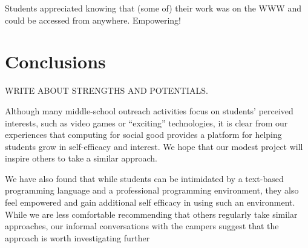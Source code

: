 Students appreciated knowing that (some of) their work was on the
WWW and could be accessed from anywhere.  Empowering!

\section{Conclusions}

WRITE ABOUT STRENGTHS AND POTENTIALS.

Although many middle-school outreach activities focus on students'
perceived interests, such as video games or ``exciting'' technologies,
it is clear from our experiences that computing for social good
provides a platform for helping students grow in self-efficacy and
interest.  We hope that our modest project will inspire others to
take a similar approach.

We have also found that while students can be intimidated by a text-based
programming language and a professional programming environment, they also
feel empowered and gain additional self efficacy in using such an environment.
While we are less comfortable recommending that others regularly take similar
approaches, our informal conversations with the campers suggest that the
approach is worth investigating further
